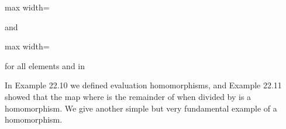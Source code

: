 \documentclass[11pt,oneside]{article}
\begin{document}
\begin{BookBody}
\begin{center}\begin{adjustbox}{max width=\linewidth}\end{adjustbox}\end{center}

\noindent and

\begin{center}\begin{adjustbox}{max width=\linewidth}\end{adjustbox}\end{center}

\noindent for all elements  and  in  \BookEnd{\blacksquare}

In Example 22.10 we defined evaluation homomorphisms, and Example 22.11 showed that the map  where  is the remainder of  when divided 
by  is a homomorphism. We give another simple but very fundamental example of a homomorphism.

\end{BookBody}

\BookNarrativetrue
\end{document}
